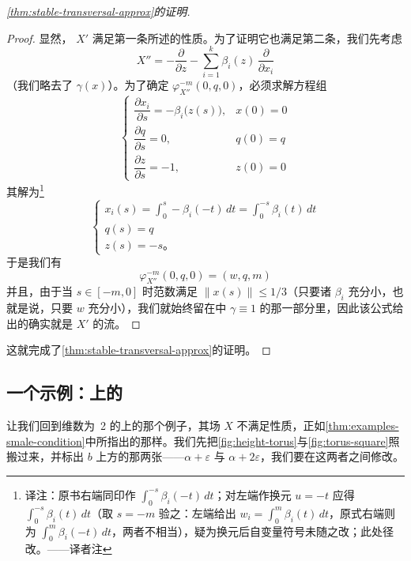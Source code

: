 \begin{proof}[\cref{thm:stable-transversal-approx}的证明]
\begin{proof}
显然，\trVectorField{} $X'$ 满足第一条所述的性质。为了证明它也满足第二条，我们先考虑\trVectorField
\[
X''=-\frac{\partial}{\partial z}-\sum_{i=1}^{k}\beta_i(z)\,\frac{\partial}{\partial x_i}
\]
（我们略去了 $\gamma(x)$）。为了确定 $\varphi^{-m}_{X''}(0,q,0)$，必须求解\trDifferential{}方程组
\[
\left\{
\begin{array}{ll}
\dfrac{\partial x_i}{\partial s}=-\beta_i\bigl(z(s)\bigr), & x(0)=0\\[2.5ex]
\dfrac{\partial q}{\partial s}=0, & q(0)=q\\[2.5ex]
\dfrac{\partial z}{\partial s}=-1, & z(0)=0
\end{array}
\right.
\]
其解为\footnote{译注：原书右端同印作 $\int_0^{-s}\beta_i(-t)\,dt$；对左端作换元 $u=-t$ 应得 $\int_0^{-s}\beta_i(t)\,dt$（取 $s=-m$ 验之：左端给出 $w_i=\int_0^{m}\beta_i(t)\,dt$，原式右端则为 $\int_0^{m}\beta_i(-t)\,dt$，两者不相当），疑为换元后自变量符号未随之改；此处径改。——译者注}
\[
\left\{
\begin{array}{l}
x_i(s)=\displaystyle\int_0^s-\beta_i(-t)\,dt=\int_0^{-s}\beta_i(t)\,dt\\[2.5ex]
q(s)=q\\
z(s)=-s\text{。}
\end{array}
\right.
\]
于是我们有
\[
\varphi^{-m}_{X''}(0,q,0)=(w,q,m)
\]
并且，由于当 $s\in[-m,0]$ 时范数满足 $\|x(s)\|\le 1/3$（只要诸 $\beta_i$ 充分小，也就是说，只要 $w$ 充分小），我们就始终留在\trDisk{}中 $\gamma\equiv 1$ 的那一部分里，因此该公式给出的确实就是 $X'$ 的流。
\end{proof}

这就完成了\cref{thm:stable-transversal-approx}的证明。
\end{proof}

\subsection{一个示例：\trTorus{}上的\trHeightFunction}
\label{subsec:illustration-torus}

让我们回到维数为~2 的\trTorus{}上\trHeightFunction{}的那个例子，其\trGradient{}场 $X$ 不满足\trSmale{}性质，正如\cref{thm:examples-smale-condition}中所指出的那样。我们先把\cref{fig:height-torus}与\cref{fig:torus-square}照搬过来，并标出\trCriticalPoint{} $b$ 上方的那两张\trLevelSet——$\alpha+\varepsilon$ 与 $\alpha+2\varepsilon$，我们要在这两者之间修改\trVectorField。

